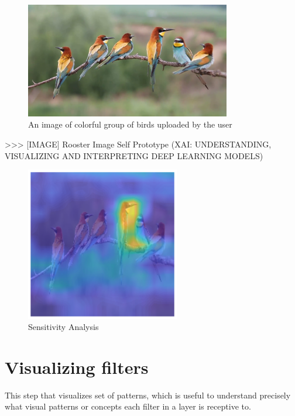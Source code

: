 \begin{figure}[htbp]
\centering
\includegraphics[width=0.80\textwidth]{images/colorful-group-of-birds-get-together_vkmuak6_e__F0000.png}
\caption{An image of colorful group of birds uploaded by the user}
\label{fig:myFig}
\end{figure}

>>> [IMAGE] Rooster Image Self Prototype (XAI: UNDERSTANDING, VISUALIZING AND INTERPRETING DEEP LEARNING MODELS)

\begin{figure}[htbp]
\centering
\includegraphics[width=0.60\textwidth]{images/heatmap-class-activations.png}
\caption{Sensitivity Analysis}
\label{fig:heatmap-1}
\end{figure}

\section*{Visualizing filters}

This step that visualizes set of patterns, which is useful to understand precisely what visual patterns or concepts each filter in a layer is receptive to.

